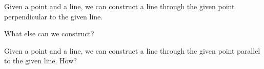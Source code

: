Given a point and a line, we can construct a line through the given point perpendicular to the given line.

What else can we construct?



Given a point and a line, we can construct a line through the given point parallel to the given line. How?











